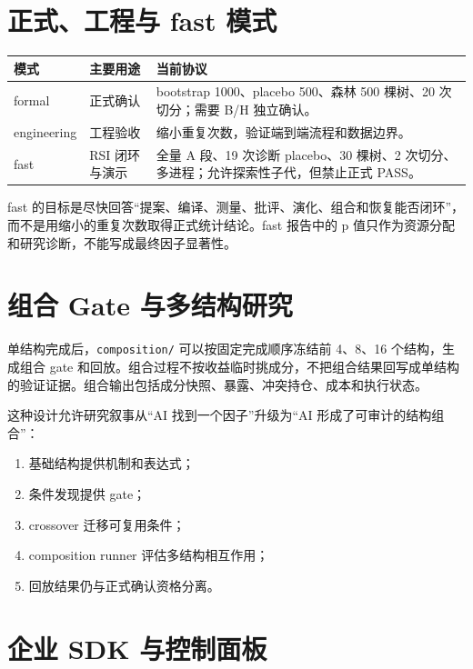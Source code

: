 \documentclass[11pt,a4paper]{article}
\newcommand{\code}[1]{\texttt{#1}}
\begin{document}
\section{正式、工程与 fast 模式}
\begin{longtable}{p{}p{}p{}}
\toprule
模式 & 主要用途 & 当前协议 \\
\midrule
formal & 正式确认 & bootstrap 1000、placebo 500、森林 500 棵树、20 次切分；需要 B/H 独立确认。 \\
engineering & 工程验收 & 缩小重复次数，验证端到端流程和数据边界。 \\
fast & RSI 闭环与演示 & 全量 A 段、19 次诊断 placebo、30 棵树、2 次切分、多进程；允许探索性子代，但禁止正式 PASS。 \\
\bottomrule
\end{longtable}

fast 的目标是尽快回答“提案、编译、测量、批评、演化、组合和恢复能否闭环”，而不是用缩小的重复次数取得正式统计结论。fast 报告中的 p 值只作为资源分配和研究诊断，不能写成最终因子显著性。

\section{组合 Gate 与多结构研究}
单结构完成后，\code{composition/} 可以按固定完成顺序冻结前 4、8、16 个结构，生成组合 gate 和回放。组合过程不按收益临时挑成分，不把组合结果回写成单结构的验证证据。组合输出包括成分快照、暴露、冲突持仓、成本和执行状态。

这种设计允许研究叙事从“AI 找到一个因子”升级为“AI 形成了可审计的结构组合”：
\begin{enumerate}[leftmargin=2em]
  \item 基础结构提供机制和表达式；
  \item 条件发现提供 gate；
  \item crossover 迁移可复用条件；
  \item composition runner 评估多结构相互作用；
  \item 回放结果仍与正式确认资格分离。
\end{enumerate}

\section{企业 SDK 与控制面板}
\end{document}
